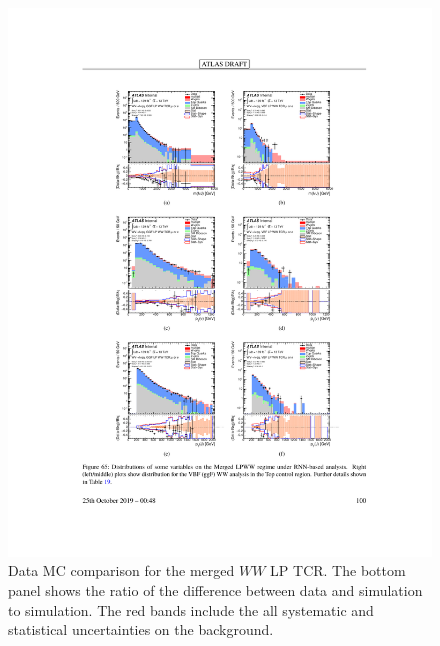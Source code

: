 \begin{figure}[htbp]
  \centering
  \includegraphics{figures/Analysis/datamc/merged_lp_ww_tcr.pdf}
      \caption{Data MC comparison for the merged $WW$ LP TCR. The bottom panel shows the ratio of the difference between data and simulation to simulation. The red bands include the all systematic and statistical uncertainties on the background. } 
  \label{fig:merged_lp_ww_TCR_datamc}
\end{figure} 
\FloatBarrier


